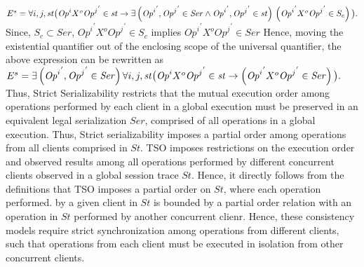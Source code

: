 \documentclass{sig-alternate-05-2015}
\begin{document}
 $E^{s} =  \forall i, j, \mathit{st} \big( \mathit{Op}^i X^o {\mathit{Op}^j}^{'} \in \mathit{st}
\\ \rightarrow
\exists \left( {\mathit{Op}^i}^{'}, {\mathit{Op}^j}^{'} \in \mathit{Ser} \wedge {\mathit{Op}^i}^{'}, {\mathit{Op}^j}^{'} \in \mathit{st} \right) \\ 
\left( {\mathit{Op}^i}^{'} X^o {\mathit{Op}^j}^{'} \in S_c \right) \big).$
Since, $ \mathit{S_c} \subset \mathit{Ser}$, ${\mathit{Op}^i}^{'} X^o {\mathit{Op}^j}^{'} \in \mathit{S_c}$ implies ${\mathit{Op}^i}^{'} X^o {\mathit{Op}^j}^{'} \in \mathit{Ser}$
Hence, moving the existential quantifier out of the enclosing scope of the universal quantifier, the above expression can be rewritten as
\\ $E^{s} =  \exists \left( {\mathit{Op}^i}^{'}, {\mathit{Op}^j}^{'} \in \mathit{Ser} \right) \forall i, j, \mathit{st} \big( \mathit{Op}^i X^o {\mathit{Op}^j}^{'} \in \mathit{st}
\\ \rightarrow \left( {\mathit{Op}^i}^{'} X^o {\mathit{Op}^j}^{'} \in \mathit{Ser} \right) \big).$
 Thus, Strict Serializability restricts that the mutual execution order among operations
performed by each client in a global execution must be preserved in an equivalent  legal serialization $\mathit{Ser}$,
comprised of all operations in a global execution. Thus, Strict serializability imposes a partial order among  operations from all clients comprised in  $\mathit{St}$.
 TSO 
 imposes restrictions on the execution order and observed results among all operations performed by different concurrent clients observed in a global session trace $\mathit{St}$. Hence, it directly follows from the definitions that TSO imposes a partial order on  $\mathit{St}$, where each operation performed. by a given client in $\mathit{St}$ is bounded by a partial order relation with an operation in $\mathit{St}$ performed by another concurrent clienr.
 Hence, these consistency models require strict synchronization among operations from different clients, such that
 operations from each client must  be executed in isolation from other concurrent clients.   
 
\end{document}
